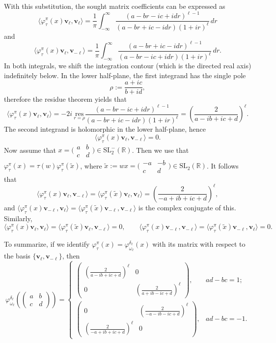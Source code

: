 \documentclass[11pt,oneside]{amsart}
\numberwithin{equation}{section}
\theoremstyle{remark}
\theoremstyle{plain}
\newcommand\SL{\mathrm{SL}}
\newcommand\RR{\mathbb{R}}
\newcommand{\bv}{\mathbf{v}}
\begin{document}
With this substitution, the sought matrix coefficients can be expressed as
\[\langle\varphi_\tau^\pi(x)\bv_\ell,\bv_\ell\rangle=\frac{1}{\pi}\int_{-\infty}^\infty\frac{(a-br-ic+idr)^{\ell-1}}{(a-br+ic-idr)(1+ir)^\ell}\,dr\]
and
\[\langle\varphi_\tau^\pi(x)\bv_\ell,\bv_{-\ell}\rangle
=\frac{1}{\pi}\int_{-\infty}^\infty\frac{(a-br+ic-idr)^{\ell-1}}{(a-br-ic+idr)(1+ir)^\ell}\,dr.\]
In both integrals, we shift the integration contour (which is the directed real axis) indefinitely below. In the lower half-plane, the first integrand has the single pole
\[\rho:=\frac{a+ic}{b+id},\]
therefore the residue theorem yields that
\[\langle\varphi_\tau^\pi(x)\bv_\ell,\bv_\ell\rangle
=-2i\ \underset{r=\rho}{\mathrm{res}}\frac{(a-br-ic+idr)^{\ell-1}}{(a-br+ic-idr)(1+ir)^\ell}
=\left(\frac{2}{a-ib+ic+d}\right)^\ell.\]
The second integrand is holomorphic in the lower half-plane, hence
\[\langle\varphi_\tau^\pi(x)\bv_\ell,\bv_{-\ell}\rangle=0.\]
Now assume that $x=\bigl(\begin{smallmatrix} a & b \\ c & d \end{smallmatrix}\bigr)\in\SL_2^-(\RR)$. Then we use that $\varphi_\tau^\pi(x)=\tau(w)\varphi_\tau^\pi(\widetilde x)$, where $\widetilde x:=wx=\bigl(\begin{smallmatrix} -a & -b \\ c & d \end{smallmatrix}\bigr)\in\SL_2(\RR)$. It follows that
\[\langle\varphi_\tau^\pi(x)\bv_\ell,\bv_{-\ell}\rangle=\langle\varphi_\tau^\pi(\widetilde x)\bv_\ell,\bv_\ell\rangle
=\left(\frac{2}{-a+ib+ic+d}\right)^\ell,\]
and $\langle\varphi_\tau^\pi(x)\bv_{-\ell},\bv_\ell\rangle=\langle\varphi_\tau^\pi(\widetilde x)\bv_{-\ell},\bv_{-\ell}\rangle$ is the complex conjugate of this. Similarly,
\[\langle\varphi_\tau^\pi(x)\bv_\ell,\bv_\ell\rangle=\langle\varphi_\tau^\pi(\widetilde x)\bv_\ell,\bv_{-\ell}\rangle=0,\qquad
\langle\varphi_\tau^\pi(x)\bv_{-\ell},\bv_{-\ell}\rangle=\langle\varphi_\tau^\pi(\widetilde x)\bv_{-\ell},\bv_\ell\rangle=0.\]

To summarize, if we identify $\varphi_\tau^\pi(x)=\varphi_{\omega_{\ell}}^{\delta_{\ell}}(x)$ with its matrix with respect to the basis $\{\bv_\ell,\bv_{-\ell}\}$, then
\begin{equation}\label{basicphi}
\varphi_{\omega_{\ell}}^{\delta_{\ell}}\left(\begin{pmatrix} a & b \\ c & d\end{pmatrix}\right)=\begin{cases} \begin{pmatrix} \left(\frac{2}{a-ib+ic+d}\right)^{\ell} & 0 \\ 0 & \left(\frac{2}{a+ib-ic+d}\right)^{\ell} \end{pmatrix},& ad-bc=1; \\ \begin{pmatrix} 0 & \left(\frac{2}{-a-ib-ic+d}\right)^{\ell} \\ \left(\frac{2}{-a+ib+ic+d}\right)^{\ell} & 0 \end{pmatrix}, & ad-bc=-1. \end{cases}
\end{equation}
\end{document}
